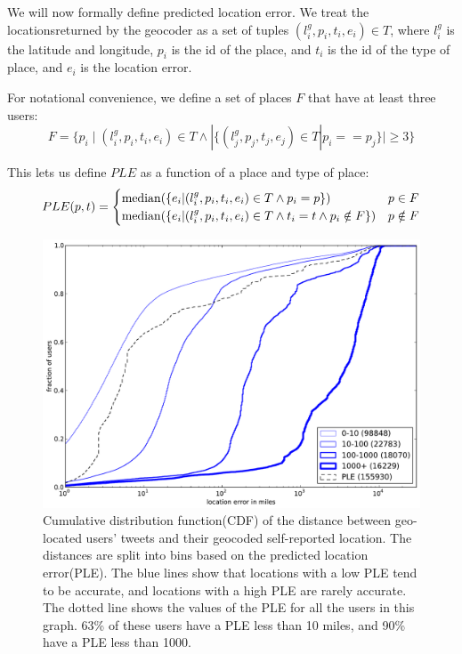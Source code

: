 \newcommand{\geotuple}{{(l^g_i,p_i,t_i,e_i) \in T}}

We will now formally define predicted location error.
%
We treat the locationsreturned by the geocoder as a set of tuples $\geotuple$,
where $l^g_i$ is the latitude and longitude, $p_i$ is the id of the place, and
$t_i$ is the id of the type of place, and $e_i$ is the location error.

For notational convenience, we define a set of places $F$ that have at least
three users:
\[
    F = \{ p_i \mid \geotuple \land |\{(l^g_j,p_j,t_j,e_j) \in T|p_i==p_j\}| \geq 3 \}
\]

This lets us define $PLE$ as a function of a place and type of place:
\[
    PLE(p,t) =
    \begin{cases}
        \median(\{e_i |\geotuple \land p_i=p\})  & p \in F \\
        \median(\{e_i |\geotuple \land t_i=t \land p_i \notin F\})  & p \notin F \\
    \end{cases}
\]

\begin{figure}[tb]
\centering
\includegraphics[width=\linewidth]{figures/mloc_mdist.pdf}
\caption{
Cumulative distribution function(CDF) of the distance between geo-located
users' tweets and their geocoded self-reported location.
%
The distances are split into bins based on the predicted location error(PLE).
%
The blue lines show that locations with a low PLE tend to be accurate, and
locations with a high PLE are rarely accurate.
%
The dotted line shows the values of the PLE for all the
users in this graph.
%
63\% of these users have a PLE less than 10 miles, and 90\% have a PLE
less than 1000.
}
\label{fig:DiffMlocMdist}
\end{figure}

